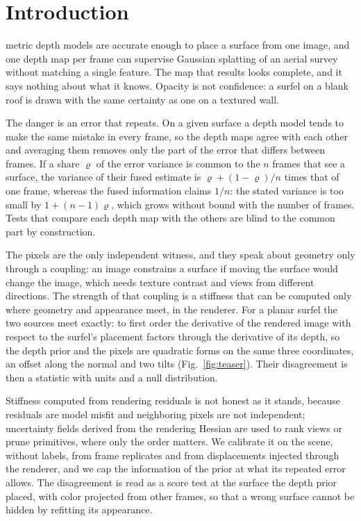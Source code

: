 \section{Introduction}
\label{sec:intro}

 metric depth models \cite{est_depthpro,est_metric3dv2,est_unidepth,est_dav2} are
accurate enough to place a surface from one image, and one depth map per frame can supervise Gaussian
splatting \cite{gs_3dgs,gs_2dgs,gs_dnsplatter} of an aerial survey without matching a single feature. The
map that results looks complete, and it says nothing about what it knows. Opacity is not confidence: a
surfel on a blank roof is drawn with the same certainty as one on a textured wall.

The danger is an error that repeats. On a given surface a depth model tends to make the same mistake in
every frame, so the depth maps agree with each other and averaging them removes only the part of the error
that differs between frames. If a share $\varrho$ of the error variance is common to the $n$ frames that
see a surface, the variance of their fused estimate is $\varrho+(1-\varrho)/n$ times that of one frame,
whereas the fused information claims $1/n$: the stated variance is too small by $1+(n-1)\varrho$, which
grows without bound with the number of frames. Tests that compare each depth map with the others
\cite{stat_teunissen_dia,flt_raim_joerger,fus_colmap_mvs} are blind to the common part by construction.

The pixels are the only independent witness, and they speak about geometry only through a coupling: an
image constrains a surface if moving the surface would change the image, which needs texture contrast and
views from different directions. The strength of that coupling is a stiffness that can be computed only
where geometry and appearance meet, in the renderer. For a planar surfel \cite{gs_2dgs} the two sources
meet exactly: to first order the derivative of the rendered image with respect to the surfel's placement
factors through the derivative of its depth, so the depth prior and the pixels are quadratic forms on the
same three coordinates, an offset along the normal and two tilts (Fig.~\ref{fig:teaser}). Their
disagreement is then a statistic with units and a null distribution.

Stiffness computed from rendering residuals is not honest as it stands, because residuals are model misfit
and neighboring pixels are not independent; uncertainty fields derived from the rendering Hessian
\cite{unc_fisherrf,unc_pup3dgs,unc_ougs} are used to rank views or prune primitives, where only the order
matters. We calibrate it on the scene, without labels, from frame replicates and from displacements
injected through the renderer, and we cap the information of the prior at what its repeated error allows.
The disagreement is read as a score test at the surface the depth prior placed, with color projected from
other frames, so that a wrong surface cannot be hidden by refitting its appearance.

